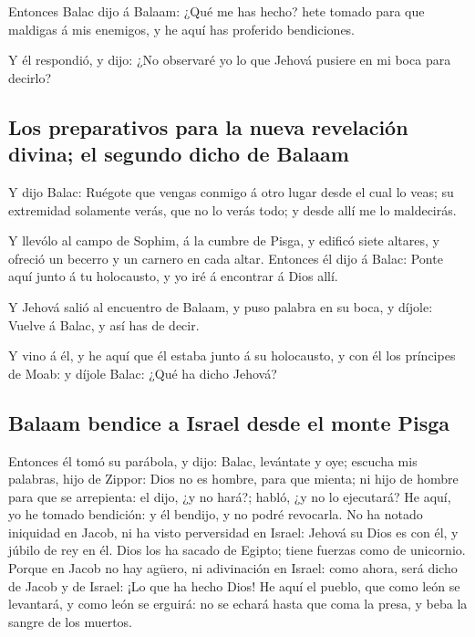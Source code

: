  Entonces Balac dijo á Balaam: ¿Qué me has hecho? hete
tomado para que maldigas á mis enemigos, y he aquí has proferido
bendiciones.

 Y él respondió, y dijo: ¿No observaré yo lo que Jehová
pusiere en mi boca para decirlo?

\hypertarget{los-preparativos-para-la-nueva-revelaciuxf3n-divina-el-segundo-dicho-de-balaam}{%
\subsection{Los preparativos para la nueva revelación divina; el segundo
dicho de
Balaam}\label{los-preparativos-para-la-nueva-revelaciuxf3n-divina-el-segundo-dicho-de-balaam}}

 Y dijo Balac: Ruégote que vengas conmigo á otro lugar
desde el cual lo veas; su extremidad solamente verás, que no lo verás
todo; y desde allí me lo maldecirás.

 Y llevólo al campo de Sophim, á la cumbre de Pisga, y
edificó siete altares, y ofreció un becerro y un carnero en cada altar.
 Entonces él dijo á Balac: Ponte aquí junto á tu
holocausto, y yo iré á encontrar á Dios allí.

 Y Jehová salió al encuentro de Balaam, y puso palabra en
su boca, y díjole: Vuelve á Balac, y así has de decir.

 Y vino á él, y he aquí que él estaba junto á su
holocausto, y con él los príncipes de Moab: y díjole Balac: ¿Qué ha
dicho Jehová?

\hypertarget{balaam-bendice-a-israel-desde-el-monte-pisga}{%
\subsection{Balaam bendice a Israel desde el monte
Pisga}\label{balaam-bendice-a-israel-desde-el-monte-pisga}}

 Entonces él tomó su parábola, y dijo: Balac, levántate y
oye; escucha mis palabras, hijo de Zippor:  Dios no es
hombre, para que mienta; ni hijo de hombre para que se arrepienta: el
dijo, ¿y no hará?; habló, ¿y no lo ejecutará?  He aquí,
yo he tomado bendición: y él bendijo, y no podré revocarla.
 No ha notado iniquidad en Jacob, ni ha visto perversidad
en Israel: Jehová su Dios es con él, y júbilo de rey en él.
 Dios los ha sacado de Egipto; tiene fuerzas como de
unicornio.  Porque en Jacob no hay agüero, ni adivinación
en Israel: como ahora, será dicho de Jacob y de Israel: ¡Lo que ha hecho
Dios!  He aquí el pueblo, que como león se levantará, y
como león se erguirá: no se echará hasta que coma la presa, y beba la
sangre de los muertos.

